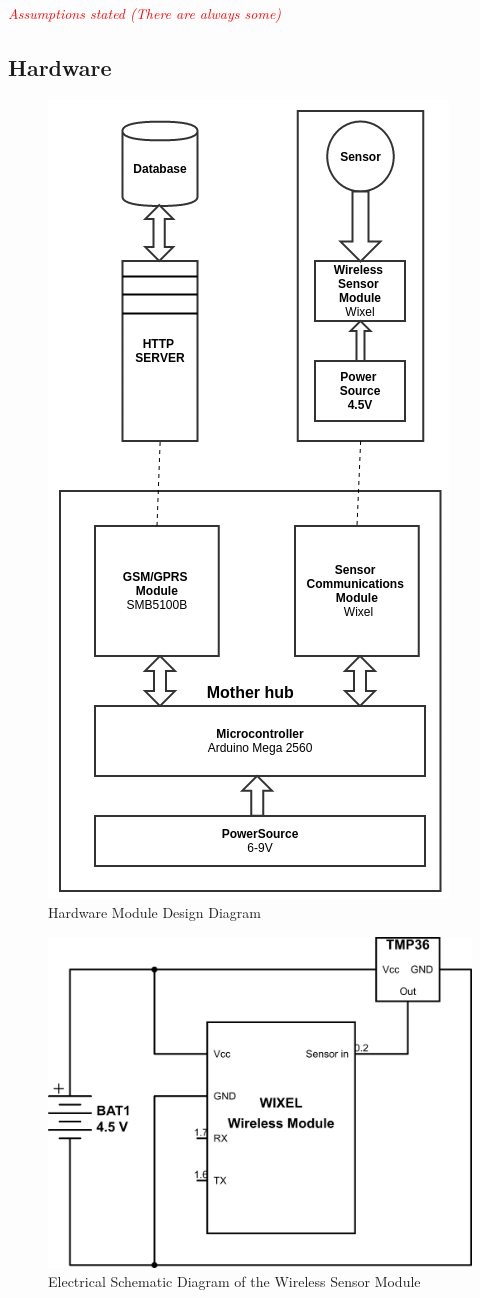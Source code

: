 \textit{\textcolor{red}{Assumptions stated (There are always some)}}


\subsection{Hardware}

\begin{figure}
\centering
\includegraphics[width=0.5\linewidth]{graphics/HardwareMDD}
\caption{Hardware Module Design Diagram\label{fig:HardwareMDD}}
\end{figure}

\begin{figure}
\centering
\includegraphics[width=0.5\linewidth]{graphics/sensormodule_schematic}
\caption{Electrical Schematic Diagram of the Wireless Sensor Module\label{fig:sensormodule_schematic}}
\end{figure}

